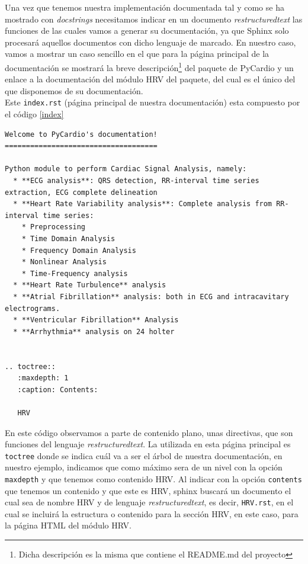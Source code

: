 Una vez que tenemos nuestra implementación documentada tal y como se ha mostrado con \textit{docstrings} necesitamos indicar en un documento \textit{restructuredtext} las funciones de las cuales vamos a generar su documentación, ya que Sphinx solo procesará aquellos documentos con dicho lenguaje de marcado. En nuestro caso, vamos a mostrar un caso sencillo en el que para la página principal de la documentación se mostrará la breve descripción\footnote{Dicha descripción es la misma que contiene el README.md del proyecto} del paquete de PyCardio y un enlace a la documentación del módulo HRV del paquete, del cual es el único del que disponemos de su documentación. \\
Este \texttt{index.rst} (página principal de nuestra documentación) esta compuesto por el código \ref{index}
\begin{lstlisting}[caption=\texttt{index.rst},label=index]
Welcome to PyCardio's documentation!
====================================

Python module to perform Cardiac Signal Analysis, namely:
  * **ECG analysis**: QRS detection, RR-interval time series extraction, ECG complete delineation
  * **Heart Rate Variability analysis**: Complete analysis from RR-interval time series:
    * Preprocessing
    * Time Domain Analysis
    * Frequency Domain Analysis
    * Nonlinear Analysis
    * Time-Frequency analysis
  * **Heart Rate Turbulence** analysis
  * **Atrial Fibrillation** analysis: both in ECG and intracavitary electrograms.
  * **Ventricular Fibrillation** Analysis
  * **Arrhythmia** analysis on 24 holter


.. toctree::
   :maxdepth: 1
   :caption: Contents:

   HRV

\end{lstlisting}
En este código observamos a parte de contenido plano, unas directivas, que son funciones del lenguaje \textit{restructuredtext}. La utilizada en esta página principal es \texttt{toctree} donde se indica cuál va a ser el árbol de nuestra documentación, en nuestro ejemplo, indicamos que como máximo sera de un nivel con la opción \texttt{maxdepth} y que tenemos como contenido HRV. Al indicar con la opción \texttt{contents} que tenemos un contenido y que este es HRV, sphinx buscará un documento el cual sea de nombre HRV y de lenguaje \textit{restructuredtext}, es decir, \texttt{HRV.rst}, en el cual se incluirá la estructura o contenido para la sección HRV, en este caso, para la página HTML del módulo HRV. \\
